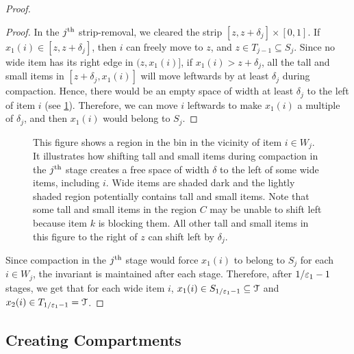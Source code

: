 \begin{proof}
\begin{proof}
In the $j^{\textrm{th}}$ strip-removal, we cleared the strip $[z, z+\delta_j] \times [0, 1]$.
If $x_1(i) \in [z, z+\delta_j]$, then $i$ can freely move to $z$,
and $z \in T_{j-1} \subseteq S_j$.
Since no wide item has its right edge in $(z, x_1(i)]$, if $x_1(i) > z + \delta_j$,
all the tall and small items in $[z+\delta_j, x_1(i)]$ will move leftwards by
at least $\delta_j$ during compaction.
Hence, there would be an empty space of width at least $\delta_j$
to the left of item $i$ (see \cref{fig:compaction-zoom}).
Therefore, we can move $i$ leftwards to make
$x_1(i)$ a multiple of $\delta_j$, and then $x_1(i)$ would belong to $S_j$.
\end{proof}

\begin{figure}[!htb]
\centering

\caption[Creation of empty space during compaction.]%
{This figure shows a region in the bin in the vicinity of item $i \in W_j$.
It illustrates how shifting tall and small items during compaction in the $j^{\textrm{th}}$ stage
creates a free space of width $\delta$ to the left of some wide items, including $i$.
Wide items are shaded dark and the lightly shaded region
potentially contains tall and small items.
Note that some tall and small items in the region $C$
may be unable to shift left because item $k$ is blocking them.
All other tall and small items in this figure to the right of $z$
can shift left by $\delta_j$.}
\label{fig:compaction-zoom}
\end{figure}

Since compaction in the $j^{\textrm{th}}$ stage would force $x_1(i)$ to belong to $S_j$
for each $i \in W_j$, the invariant is maintained after each stage.
Therefore, after $1/\varepsilon_1-1$ stages, we get that for each wide item $i$,
$x_1(i) \in S_{1/\varepsilon_1-1} \subseteq \mathcal{T}$ and $x_2(i) \in T_{1/\varepsilon_1-1} = \mathcal{T}$.
\end{proof}

\subsection{Creating Compartments}

